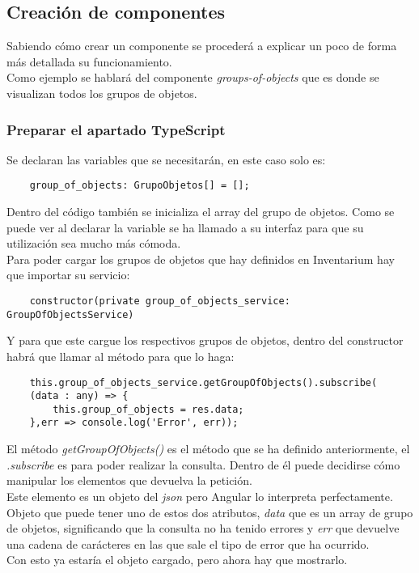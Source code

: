 \subsection{Creación de componentes}
Sabiendo cómo crear un componente se procederá a explicar un poco de forma más detallada su funcionamiento.
\\Como ejemplo se hablará del componente \textit{groups-of-objects} que es donde se visualizan todos los grupos de objetos.

\subsubsection{Preparar el apartado TypeScript}
Se declaran las variables que se necesitarán, en este caso solo es:
\begin{verbatim}
    group_of_objects: GrupoObjetos[] = [];
\end{verbatim}
Dentro del código también se inicializa el array del grupo de objetos. Como se puede ver al declarar la variable se ha llamado a su interfaz para que su utilización sea mucho más cómoda.
\\Para poder cargar los grupos de objetos que hay definidos en Inventarium hay que importar su servicio:
\begin{verbatim}
    constructor(private group_of_objects_service: GroupOfObjectsService)
\end{verbatim}
Y para que este cargue los respectivos grupos de objetos, dentro del constructor habrá que llamar al método para que lo haga:
\begin{verbatim}
    this.group_of_objects_service.getGroupOfObjects().subscribe(
    (data : any) => { 
        this.group_of_objects = res.data;
    },err => console.log('Error', err));
\end{verbatim}
El método \textit{getGroupOfObjects()} es el método que se ha definido anteriormente, el \textit{.subscribe} es para poder realizar la consulta. Dentro de él puede decidirse cómo manipular los elementos que devuelva la petición.
\\Este elemento es un objeto del \textit{json} pero Angular lo interpreta perfectamente. Objeto que puede tener uno de estos dos atributos, \textit{data} que es un array de grupo de objetos, significando que la consulta no ha tenido errores y \textit{err} que devuelve una cadena de carácteres en las que sale el tipo de error que ha ocurrido.
\\Con esto ya estaría el objeto cargado, pero ahora hay que mostrarlo.